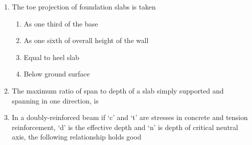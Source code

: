 \documentclass[11pt,a4paper]{article}
\begin{document}
\begin{enumerate}
{}
\\
\item{The toe projection of foundation slabs is taken}
\begin{enumerate}[label=\Alph*.]
\item{As one third of the base}
\item{As one sixth of overall height of the wall}
\item{Equal to heel slab}
\item{Below ground surface}
\end{enumerate}
\item{The maximum ratio of span to depth of a slab simply supported and spanning in one direction, is}
\\
\item{In a doubly-reinforced beam if `c' and `t' are stresses in concrete and tension reinforcement, `d' is the effective depth and `n' is depth of critical neutral axis, the following relationship holds good
}
\\
\end{enumerate}
\end{document}
